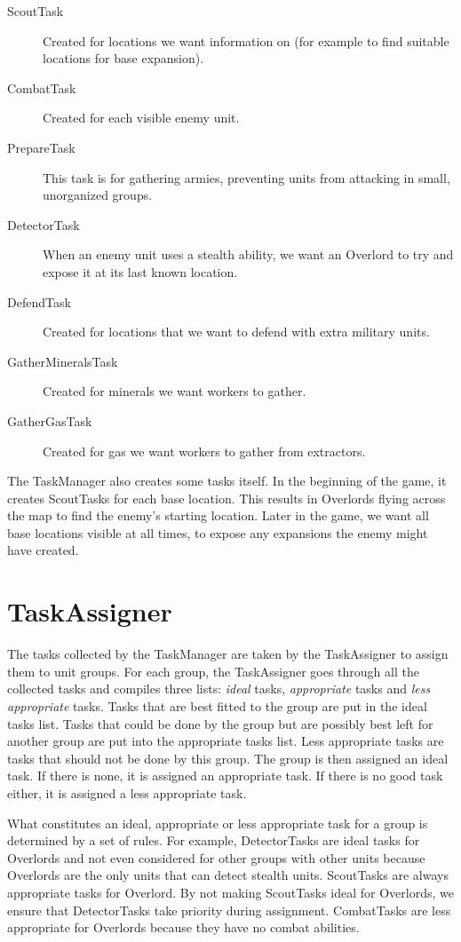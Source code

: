 \begin{description}
\item[ScoutTask] Created for locations we want information on (for example to find suitable locations for base expansion).
\item[CombatTask] Created for each visible enemy unit.
\item[PrepareTask] This task is for gathering armies, preventing units from attacking in small, unorganized groups.
\item[DetectorTask] When an enemy unit uses a stealth ability, we want an Overlord to try and expose it at its last known location.
\item[DefendTask] Created for locations that we want to defend with extra military units.
\item[GatherMineralsTask] Created for minerals we want workers to gather.
\item[GatherGasTask] Created for gas we want workers to gather from extractors.
\end{description}

The TaskManager also creates some tasks itself. In the beginning of the game, it creates ScoutTasks for each base location. This results in Overlords flying across the map to find the enemy's starting location. Later in the game, we want all base locations visible at all times, to expose any expansions the enemy might have created.

\section{TaskAssigner}

The tasks collected by the TaskManager are taken by the TaskAssigner to assign them to unit groups. For each group, the TaskAssigner goes through all the collected tasks and compiles three lists: \emph{ideal} tasks, \emph{appropriate} tasks and \emph{less appropriate} tasks. Tasks that are best fitted to the group are put in the ideal tasks list. Tasks that could be done by the group but are possibly best left for another group are put into the appropriate tasks list. Less appropriate tasks are tasks that should not be done by this group. The group is then assigned an ideal task. If there is none, it is assigned an appropriate task. If there is no good task either, it is assigned a less appropriate task.

What constitutes an ideal, appropriate or less appropriate task for a group is determined by a set of rules. For example, DetectorTasks are ideal tasks for Overlords and not even considered for other groups with other units because Overlords are the only units that can detect stealth units. ScoutTasks are always appropriate tasks for Overlord. By not making ScoutTasks ideal for Overlords, we ensure that DetectorTasks take priority during assignment. CombatTasks are less appropriate for Overlords because they have no combat abilities.

